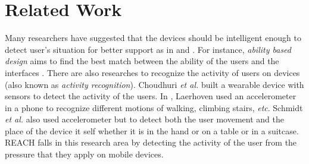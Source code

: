 \documentclass{sig-alternate}
\begin{document}
\section{Related Work}
Many researchers have suggested that the devices should be intelligent enough to detect user's situation for better support as in \cite{Johnson:1998:UMIM} and \cite{Schmidt:1999:AIC}. For instance, \emph{ability based design} aims to find the best match between the ability of the users and the interfaces \cite{Wobbrock:2011:adcpe}. There are also researches to recognize the activity of users on devices (also known as \emph{activity recognition}). Choudhuri \emph{et al.} \cite{Choudhury:2008:MSP} built a wearable device with sensors to detect the activity of the users. In \cite{Van:2000:WhatShallWe}, Laerhoven used an accelerometer in a phone to recognize different motions of walking, climbing stairs, \emph{etc}. Schmidt \emph{et al.} \cite{Schmidt:1999:advanced} also used accelerometer but to detect both the user movement and the place of the device it self whether it is in the hand or on a table or in a suitcase. REACH falls in this research area by detecting the activity of the user from the pressure that they apply on mobile devices.






%

%
%
\end{document}
